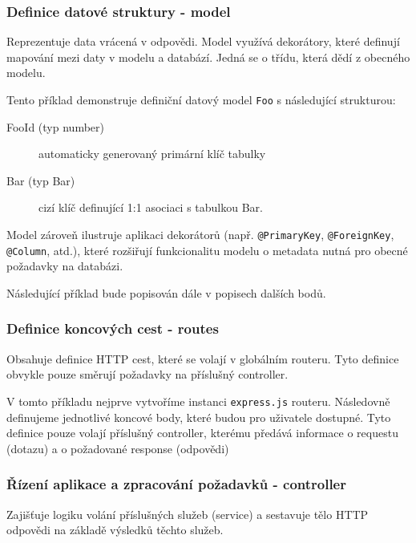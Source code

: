 \subsubsection{Definice datové struktury - model}
Reprezentuje data vrácená v odpovědi. Model využívá dekorátory, které definují mapování mezi daty v modelu a databází. Jedná se o třídu, která dědí z obecného modelu.



Tento příklad demonstruje definiční datový model \texttt{Foo} s následující strukturou:
\begin{description}
    \item[FooId (typ number)] automaticky generovaný primární klíč tabulky
    \item[Bar (typ Bar)] cizí klíč definující 1:1 asociaci s tabulkou Bar.
\end{description} 

Model zároveň ilustruje aplikaci dekorátorů (např. \texttt{@PrimaryKey}, \texttt{@ForeignKey}, \texttt{@Column}, atd.), které rozšiřují funkcionalitu modelu o metadata nutná pro obecné požadavky na databázi. 

Následující příklad bude popisován dále v popisech dalších bodů.
\subsubsection{Definice koncových cest - routes}
Obsahuje definice HTTP cest, které se volají v globálním routeru. Tyto definice obvykle pouze směrují požadavky na příslušný controller.



V tomto příkladu nejprve vytvoříme instanci \texttt{express.js} routeru. Následovně definujeme jednotlivé koncové body, které budou pro uživatele dostupné. Tyto definice pouze volají příslušný controller, kterému předává informace o requestu (dotazu) a o požadované response (odpovědi)

\subsubsection{Řízení aplikace a zpracování požadavků - controller} 
Zajišťuje logiku volání příslušných služeb (service) a sestavuje tělo HTTP odpovědi na základě výsledků těchto služeb.

